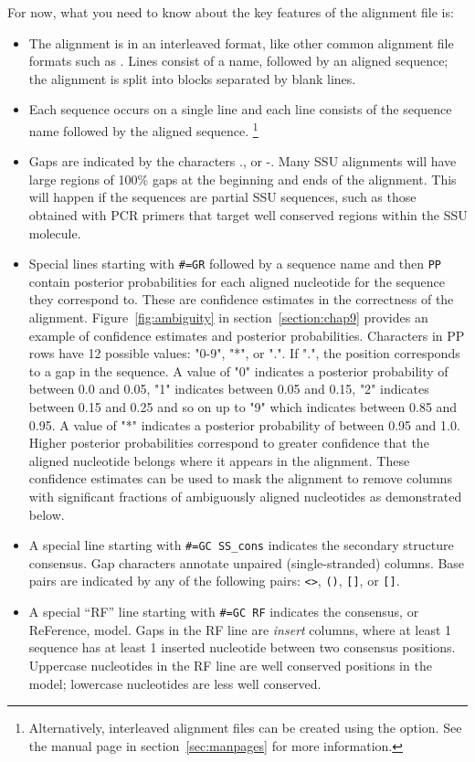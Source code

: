 For now, what you need to know about the key features of the alignment file is:
\begin{itemize}

\item The alignment is in an interleaved format, like other
  common alignment file formats such as .
  Lines consist of a name, followed by an aligned sequence;
  the alignment is split into blocks separated by blank lines.

\item Each sequence occurs on a single line and each line consists of
  the sequence name followed by the aligned sequence. \footnote{Alternatively,
  interleaved alignment files can be created using the 
  option. See the  manual page in
  section~\ref{sec:manpages} for more information.}

\item Gaps are indicated by the characters ., or -.
  Many SSU alignments will have large regions of 100\% gaps at the
  beginning and ends of the alignment. 
  This will happen if the sequences are 
  partial SSU sequences, such as those obtained with PCR
  primers that target well conserved regions within the SSU
  molecule.

\item Special lines starting with {\small\verb+#=GR+} followed by a
  sequence name and then {\small\verb+PP+} contain posterior
  probabilities for each aligned nucleotide for the sequence they
  correspond to.  These are confidence estimates in the correctness of
  the alignment.  Figure~\ref{fig:ambiguity} in
  section~\ref{section:chap9} provides an example of confidence
  estimates and posterior probabilities.  Characters in PP rows have
  12 possible values: "0-9", "*", or ".". If ".", the position
  corresponds to a gap in the sequence. A value of "0" indicates a
  posterior probability of between 0.0 and 0.05, "1" indicates between
  0.05 and 0.15, "2" indicates between 0.15 and 0.25 and so on up to
  "9" which indicates between 0.85 and 0.95. A value of "*" indicates
  a posterior probability of between 0.95 and 1.0. Higher posterior
  probabilities correspond to greater confidence that the aligned
  nucleotide belongs where it appears in the alignment.  These
  confidence estimates can be used to mask the alignment to remove
  columns with significant fractions of ambiguously aligned nucleotides
  as demonstrated below.

\item A special line starting with {\small\verb+#=GC SS_cons+}
  indicates the secondary structure consensus. Gap characters annotate
  unpaired (single-stranded) columns. Base pairs are indicated by any
  of the following pairs: \verb+<>+, \verb+()+, \verb+[]+, or
  \verb+[]+.

\item A special ``RF'' line starting with {\small\verb+#=GC RF+}
  indicates the consensus, or ReFerence, model. Gaps in the RF line
  are \emph{insert} columns, where at least 1 sequence has at least 1
  inserted nucleotide between two consensus positions. Uppercase nucleotides
  in the RF line are well conserved positions in the model; lowercase
  nucleotides are less well conserved.
\end{itemize}
